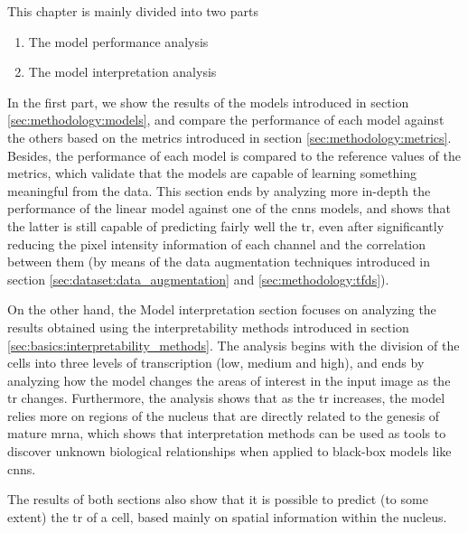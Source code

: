 
\glsresetall
\graphicspath{{./Sections/Results/Resources/}}

This chapter is mainly divided into two parts

\begin{enumerate}
    \item The model performance analysis
    \item The model interpretation analysis
\end{enumerate}

In the first part, we show the results of the models introduced in section \ref{sec:methodology:models}, and compare the performance of each model against the others based on the metrics introduced in section \ref{sec:methodology:metrics}. Besides, the performance of each model is compared to the reference values of the metrics, which validate that the models are capable of learning something meaningful from the data. This section ends by analyzing more in-depth the performance of the linear model against one of the \glspl{cnn} models, and shows that the latter is still capable of predicting fairly well the \gls{tr}, even after significantly reducing the pixel intensity information of each channel and the correlation between them (by means of the data augmentation techniques introduced in section \ref{sec:dataset:data_augmentation} and \ref{sec:methodology:tfds}).

On the other hand, the Model interpretation section focuses on analyzing the results obtained using the interpretability methods introduced in section \ref{sec:basics:interpretability_methods}. The analysis begins with the division of the cells into three levels of transcription (low, medium and high), and ends by analyzing how the model changes the areas of interest in the input image as the \gls{tr} changes. 
Furthermore, the analysis shows that as the \gls{tr} increases, the model relies more on regions of the nucleus that are directly related to the genesis of mature \gls{mrna}, which shows that interpretation methods can be used as tools to discover unknown biological relationships when applied to black-box models like \glspl{cnn}.

The results of both sections also show that it is possible to predict (to some extent) the \gls{tr} of a cell, based mainly on spatial information within the nucleus.